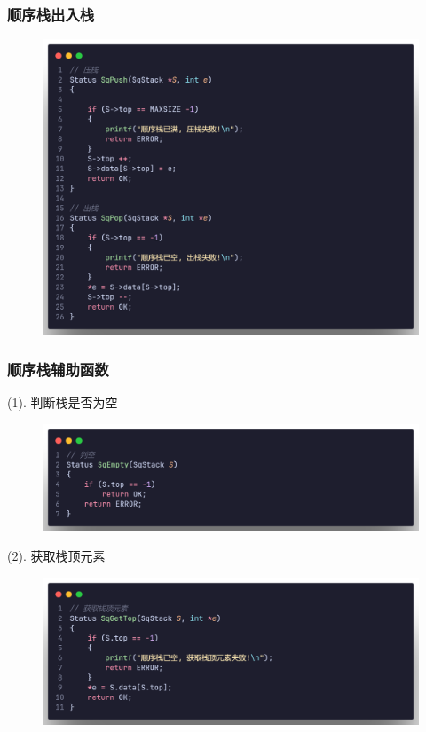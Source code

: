 \subsubsection{顺序栈出入栈}

\begin{figure}[H]
    \centering
    \includegraphics[scale=0.2]{"figure/Note/Stack/SqP.png"}
\end{figure}

\subsubsection{顺序栈辅助函数}

(1). 判断栈是否为空

\begin{figure}[H]
    \centering
    \includegraphics[scale=0.2]{"figure/Note/Stack/SqEmpty.png"}
\end{figure}

(2). 获取栈顶元素

\begin{figure}[H]
    \centering
    \includegraphics[scale=0.2]{"figure/Note/Stack/SqG.png"}
\end{figure}


